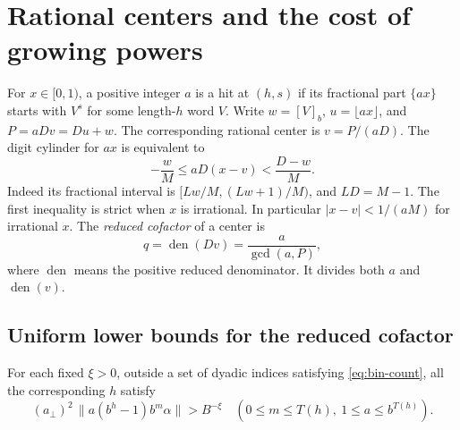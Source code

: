 \section{Rational centers and the cost of growing powers}
\label{sec:rational-centers}

For \(x\in[0,1)\), a positive integer \(a\) is a hit at \((h,s)\)
if its fractional part \(\{ax\}\) starts with \(V^s\) for some
length-\(h\) word \(V\). Write \(w=[V]_b\), \(u=\lfloor ax\rfloor\),
and \(P=aD v=Du+w\). The corresponding rational center is
\(v=P/(aD)\). The digit cylinder for \(ax\) is equivalent to
\begin{equation}\label{eq:signed-centre}
        -\frac{w}{M}\le aD(x-v)<\frac{D-w}{M}.
\end{equation}
Indeed its fractional interval is
\([Lw/M,(Lw+1)/M)\), and \(LD=M-1\). The first inequality
is strict when \(x\) is irrational. In particular
\(|x-v|<1/(aM)\) for irrational \(x\).
The \emph{reduced cofactor} of a center is
\[
 q=\operatorname{den}(Dv)=\frac{a}{\gcd(a,P)},
\]
where \(\operatorname{den}\) means the positive reduced denominator.
It divides both \(a\) and \(\operatorname{den}(v)\).

\subsection{Uniform lower bounds for the reduced cofactor}

\begin{lemma}\label{lem:late-three-forms}
For each fixed \(\xi>0\), outside a set of dyadic indices
satisfying \eqref{eq:bin-count}, all the corresponding \(h\)
satisfy
\begin{equation}\label{eq:late-three-forms}
 (a_\perp)^2\,\|a(b^h-1)b^m\alpha\|>B^{-\xi}
 \quad (0\le m\le T(h),\ 1\le a\le b^{T(h)}).
\end{equation}
\end{lemma}

